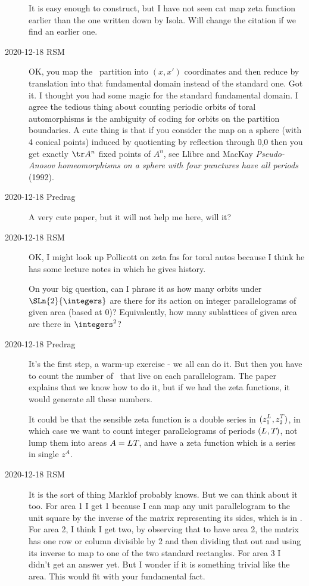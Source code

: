 \begin{description}
It is easy enough
to construct, but I have not seen cat map zeta function earlier than the
one written down by Isola. Will change the citation if we find an earlier
one.

\item[2020-12-18 RSM]
OK, you map the \AW\ partition into $(x,x')$ coordinates and then reduce by
translation into that fundamental domain instead of the standard one.
Got it.  I thought you had some magic for the standard fundamental
domain.
I agree the tedious thing about counting periodic orbits of toral
automorphisms is the ambiguity of coding for orbits on the partition
boundaries.  A cute thing is that if you consider the map on a sphere
(with 4 conical points) induced by quotienting by reflection through 0,0
then you get exactly $\tr A^n$ fixed points of $A^n$, see
Llibre and MacKay {\em {Pseudo-Anosov} homeomorphisms on a
sphere with four punctures have all periods} (1992).

\item[2020-12-18 Predrag]
A very cute paper, but it will not help me here, will it?

\item[2020-12-18 RSM]
OK, I might look up Pollicott on zeta fns for toral autos because I think
he has some lecture notes in which he gives history.

On your big question, can I phrase it as how many orbits under
$\SLn{2}{\integers}$ are there for its action on integer parallelograms of
given area (based at 0)?  Equivalently, how many sublattices of given
area are there in $\integers^2$?

\item[2020-12-18 Predrag]
It's the first step, a warm-up exercise - we all can do it.
But then you have to count the number of \twots\ that live on each
parallelogram. The paper explains that we know how to do it,
but if we had the zeta functions, it would generate all these numbers.

It could be that the sensible zeta function is
a double series in $(z_1^{L_{}},z_2^{T_{}})$, in which case we
want to count integer parallelograms of periods
$({L_{}},{T_{}})$, not lump them into areas
$A={L_{}}{T_{}}$, and have a zeta function which is a series in
single $z^A$.

\item[2020-12-18 RSM]
It is the sort of thing Marklof probably knows.  But we can think about
it too.  For area 1 I get 1 because I can map any unit parallelogram to
the unit square by the inverse of the matrix representing its sides,
which is in .  For area 2, I think I get two, by
observing that to have area 2, the matrix has one row or column divisible
by 2 and then dividing that out and using its inverse to map to one of
the two standard rectangles.  For area 3 I didn't get an answer yet.  But
I wonder if it is something trivial like the area.  This would fit with
your fundamental fact.


\end{description}
